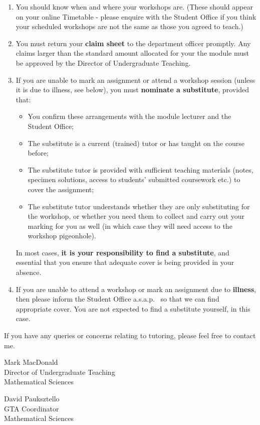 \documentclass[11pt,a4paper]{amsart}
\begin{document}
\begin{enumerate}
\item You should know when and where your workshops are. (These should appear on your online Timetable - please enquire with the Student Office if you think your scheduled workshops are not the same as those you agreed to teach.)
\item You must return your {\bf claim sheet} to the department officer promptly. Any claims larger than the standard amount allocated for your the module must be approved by the Director of Undergraduate Teaching.
\item If you are unable to mark an assignment or attend a workshop session (unless it is due to illness, see below), you must {\bf nominate a substitute}, provided that:
\begin{itemize}
\item You confirm these arrangements with the module lecturer and the Student Office;
\item The substitute is a current (trained) tutor or has taught on the course before; 
\item The substitute tutor is provided with sufficient teaching materials (notes, specimen solutions, access to students’ submitted coursework etc.) to cover the assignment;
\item The substitute tutor understands whether they are only substituting for the workshop, or whether you need them to collect and carry out your marking for you as well (in which case they will need access to the workshop pigeonhole).
\end{itemize}
In most cases, {\bf it is your responsibility to find a substitute}, and essential that you ensure that adequate cover is being provided in your absence.
\item If you are unable to attend a workshop or mark an assignment due to {\bf illness}, then please inform the Student Office a.s.a.p.~ so that we can find appropriate cover. You are not expected to find a substitute yourself, in this case.
\end{enumerate}



If you have any queries or concerns relating to tutoring, please feel free to contact me.

\begin{flushright} 
Mark MacDonald \\ 
Director of Undergraduate Teaching \\
Mathematical Sciences \\

\bigskip

David Pauksztello \\
GTA Coordinator \\
Mathematical Sciences
\end{flushright}
\end{document}
